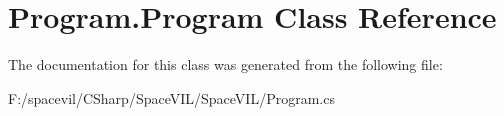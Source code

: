 \hypertarget{class_program_1_1_program}{}\section{Program.\+Program Class Reference}
\label{class_program_1_1_program}


The documentation for this class was generated from the following file\+:\begin{DoxyCompactItemize}
\item 
F\+:/spacevil/\+C\+Sharp/\+Space\+V\+I\+L/\+Space\+V\+I\+L/Program.\+cs\end{DoxyCompactItemize}
